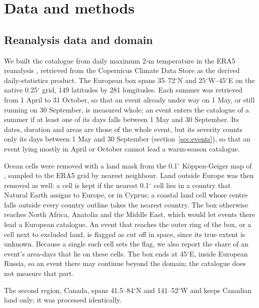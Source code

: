 \documentclass{amsdraft}
\begin{document}
\section{Data and methods}
\label{sec:methods}

\subsection{Reanalysis data and domain}
\label{sec:data}

We built the catalogue from daily maximum 2-m temperature in the ERA5
reanalysis \citep{Hersbach2020}, retrieved from the Copernicus Climate Data
Store as the derived daily-statistics product. The European box spans
35--72$^\circ$N and 25$^\circ$W--45$^\circ$E on the native 0.25$^\circ$ grid,
149 latitudes by 281 longitudes. Each summer was retrieved from 1 April to 31
October, so that an event already under way on 1 May, or still running on 30
September, is measured whole; an event enters the catalogue of a summer if at
least one of its days falls between 1 May and 30 September. Its dates,
duration and areas are those of the whole event, but its severity counts only
its days between 1 May and 30 September (section~\ref{sec:events}), so that an
event lying mostly in April or October cannot lead a warm-season catalogue.

Ocean cells were removed with a land mask from the 0.1$^\circ$
K\"oppen-Geiger map of \citet{Beck2023}, sampled to the ERA5 grid by nearest
neighbour. Land outside Europe was then removed as well: a cell is kept if
the nearest 0.1$^\circ$ cell lies in a country that Natural Earth assigns to
Europe, or in Cyprus; a coastal land cell whose centre falls outside every
country outline takes the nearest country. The box otherwise reaches North Africa, Anatolia and
the Middle East, which would let events there lead a European catalogue. An
event that reaches the outer ring of the box, or a cell next to excluded
land, is flagged as cut off in space, since its true extent is unknown.
Because a single such cell sets the flag, we also report the share of an
event's area-days that lie on these cells. The box ends at 45$^\circ$E,
inside European Russia, so an event there may continue beyond the domain;
the catalogue does not measure that part.

The second region, Canada, spans 41.5--84$^\circ$N and 141--52$^\circ$W and
keeps Canadian land only; it was processed identically.
\end{document}
